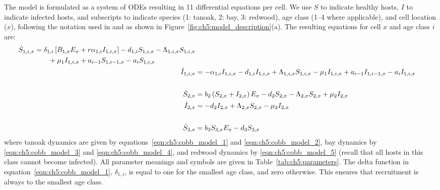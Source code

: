 The model is formulated as a system of ODEs resulting in 11 differential equations per cell. We use $S$ to indicate healthy hosts, $I$ to indicate infected hosts, and subscripts to indicate species (1: tanoak, 2: bay, 3: redwood), age class (1--4 where applicable), and cell location ($x$), following the notation used in \citet{cobb_ecosystem_2012} and as shown in Figure~\ref{fig:ch5:model_description}(a). The resulting equations for cell $x$ and age class $i$ are:
\begin{subequations}\label{eqn:ch5:cobb_model}
\begin{align}
    \begin{split}
        \dot{S}_{1,i,x} &= \delta_{1,i}\left[B_{1,x}E_x+r\alpha_{1,i}I_{1,i,x}\right] - d_{1,i}S_{1,i,x} - \Lambda_{1,i,x}S_{1,i,x} \\
        &{}\quad\quad+ \mu_1I_{1,i,x} + a_{i-1}S_{1,i-1,x} - a_iS_{1,i,x} \label{eqn:ch5:cobb_model_1}
    \end{split}\\
    \dot{I}_{1,i,x} &= -\alpha_{1,i}I_{1,i,x} - d_{1,i}I_{1,i,x} + \Lambda_{1,i,x}S_{1,i,x} - \mu_1I_{1,i,x} + a_{i-1}I_{1,i-1,x} - a_iI_{1,i,x} \label{eqn:ch5:cobb_model_2} \\\notag\\
    \dot{S}_{2,x} &= b_2\left(S_{2,x}+I_{2,x}\right)E_x - d_2S_{2,x} - \Lambda_{2,x}S_{2,x} + \mu_2I_{2,x} \label{eqn:ch5:cobb_model_3} \\
    \dot{I}_{2,x} &= - d_2I_{2,x} + \Lambda_{2,x}S_{2,x} - \mu_2I_{2,x}\label{eqn:ch5:cobb_model_4} \\\notag\\
    \dot{S}_{3,x} &= b_3S_{3,x}E_x - d_3S_{3,x} \label{eqn:ch5:cobb_model_5}
\end{align}
\end{subequations}
where tanoak dynamics are given by equations~\ref{eqn:ch5:cobb_model_1} and \ref{eqn:ch5:cobb_model_2}, bay dynamics by \ref{eqn:ch5:cobb_model_3} and \ref{eqn:ch5:cobb_model_4}, and redwood dynamics by \ref{eqn:ch5:cobb_model_5} (recall that all hosts in this class cannot become infected). All parameter meanings and symbols are given in Table~\ref{tab:ch5:parameters}. The delta function in equation~\ref{eqn:ch5:cobb_model_1}, $\delta_{1,i}$, is equal to one for the smallest age class, and zero otherwise. This ensures that recruitment is always to the smallest age class.

